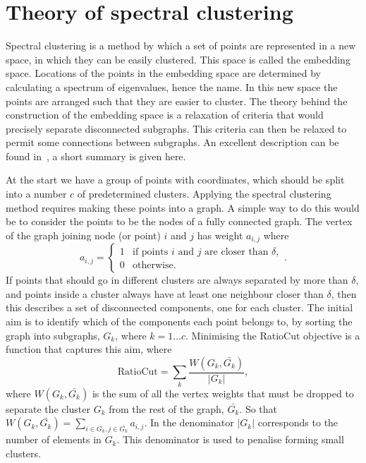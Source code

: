 \section{Theory of spectral clustering}\label{sec:spectral_theory}

Spectral clustering is a method by which a set of points are represented in a new space,
in which they can be easily clustered.
This space is called the embedding space.
Locations of the points in the embedding space are determined by calculating a
spectrum of eigenvalues, hence the name.
In this new space the points are arranged such that they are easier to cluster.
%
The theory behind the construction of the embedding space is a relaxation of criteria that would precisely
separate disconnected subgraphs.
This criteria can then be relaxed to permit some connections between subgraphs.
An excellent description can be found in~\cite{luxburg2007spectraltutorial}, a short summary is given here.

At the start we have a group of points with coordinates, which should be split into a  number \(c\) of predetermined clusters.
Applying the spectral clustering method requires making these points into a graph.
A simple way to do this would be to consider the points to be the nodes of a fully connected graph.
The vertex of the graph joining node (or point) \(i\) and \(j\) has weight \(a_{i, j}\) where
\begin{equation}
    a_{i, j}= 
    \begin{cases}
        1 & \text{if points } i \text{ and } j \text{ are closer than } \delta, \\
        0              & \text{otherwise.}
    \end{cases}
    .
\end{equation}
%
If points that should go in different clusters are always separated by more than \(\delta\),
and points inside a cluster always have at least one neighbour closer than \(\delta\),
then this describes a set of disconnected components, one for each cluster.
%
The initial aim is to identify which of the components each point belongs to,
by sorting the graph into subgraphs, \(G_k\), where \(k=1 \dots c\).
Minimising the RatioCut objective is a function that captures this aim, where 
\begin{equation}
    \text{RatioCut} = \sum_k\frac{W(G_k, \bar{G_k})}{|G_k|},
\end{equation}\label{eqn:cost_function}
where \(W(G_k, \bar{G_k})\) is the sum of all the vertex weights that must be dropped
to separate the cluster \(G_k\) from the rest of the graph, \(\bar{G_k}\).
So that \( W(G_k, \bar{G_k}) = \sum_{i \in G_k, j \in \bar{G_k}} a_{i, j} \).
In the denominator \(|G_k|\) corresponds to the number of elements in \(G_k\).
This denominator is used to penalise forming small clusters.

